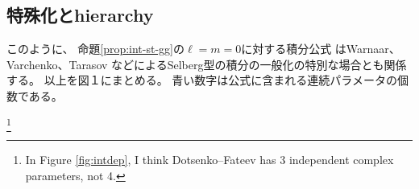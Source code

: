 \subsection{特殊化とhierarchy}
このように、
	命題\ref{prop:int-st-gg}の$\ell = m = 0$に対する積分公式
	はWarnaar、Varchenko、Tarasov などによるSelberg型の積分の一般化の特別な場合とも関係する。
	以上を図１にまとめる。
	{青}い{数字}は{公式}に{含}まれる連続パラメータの{個数}である。
			\begin{figure*}[h]
				\centering
				\begin{tikzpicture}
				
				\end{tikzpicture}
				\caption{
					命題\ref{prop:int-st-gg}の$\ell=m=0$の特別の場合とその関連結果;
いはにまれる連続パラメータのである.
				}
				\label{fig:intdep}
			\end{figure*}\footnote{In Figure \ref{fig:intdep}, I think
		Dotsenko--Fateev has 3 independent complex parameters, not 4.}

